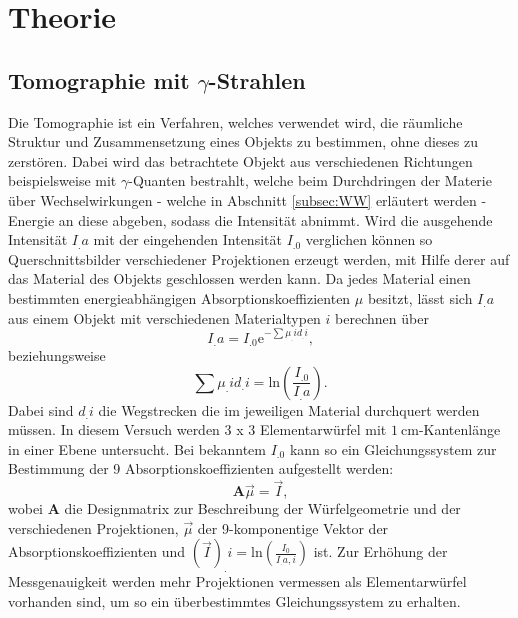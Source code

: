 \section{Theorie}
\label{sec:Theorie}

\subsection{Tomographie mit $\gamma$-Strahlen}
\label{subsec:tomographie}

Die Tomographie ist ein Verfahren, welches verwendet wird, die räumliche Struktur und Zusammensetzung eines Objekts zu bestimmen, ohne dieses zu zerstören. Dabei wird das betrachtete Objekt aus verschiedenen Richtungen beispielsweise mit $\gamma$-Quanten bestrahlt, welche beim Durchdringen der Materie über Wechselwirkungen - welche in Abschnitt \ref{subsec:WW} erläutert werden - Energie an diese abgeben, sodass die Intensität abnimmt. Wird die ausgehende Intensität $I_.a$ mit der eingehenden Intensität $I_.0$ verglichen können so Querschnittsbilder verschiedener Projektionen erzeugt werden, mit Hilfe derer auf das Material des Objekts geschlossen werden kann. Da jedes Material einen bestimmten energieabhängigen Absorptionskoeffizienten $\mu$ besitzt, lässt sich $I_.a$ aus einem Objekt mit verschiedenen Materialtypen $i$ berechnen über
\begin{equation}
I_.a = I_.0\mathrm{e}^{-\sum \mu_.i d_.i}\text{,}\label{eq:Ia}
\end{equation}
beziehungsweise
\begin{equation}
\sum \mu_.i d_.i = \mathrm{ln}\left(\frac{I_.0}{I_.a}\right)\text{.}\label{eq:mu1}
\end{equation}
Dabei sind $d_.i$ die Wegstrecken die im jeweiligen Material durchquert werden müssen.
In diesem Versuch werden 3 x 3 Elementarwürfel mit $\SI{1}{\centi\meter}$-Kantenlänge in einer Ebene untersucht. Bei bekanntem $I_.0$ kann so ein Gleichungssystem zur Bestimmung der 9 Absorptionskoeffizienten aufgestellt werden:
\begin{equation*}
\mathbf{A}\vec{\mu} = \vec{I}\text{,}
\end{equation*}
wobei $\mathbf{A}$ die Designmatrix zur Beschreibung der Würfelgeometrie und der verschiedenen Projektionen, $\vec{\mu}$ der 9-komponentige Vektor der Absorptionskoeffizienten und $\left(\vec{I}\right)_.i= \mathrm{ln}\left(\frac{I_0}{I_.{a,i}}\right)$ ist.
Zur Erhöhung der Messgenauigkeit werden mehr Projektionen vermessen als Elementarwürfel vorhanden sind, um so ein überbestimmtes Gleichungssystem zu erhalten.
